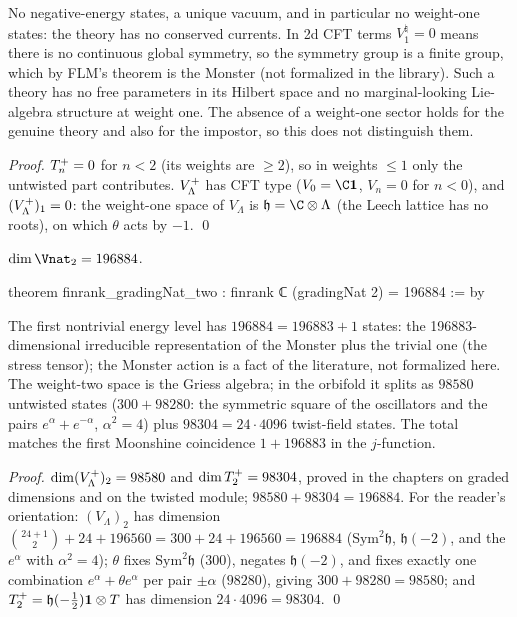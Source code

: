 \begin{physics}
No negative-energy states, a unique vacuum, and in particular no weight-one states: the theory has no conserved currents. In 2d CFT terms $V^\natural_1=0$ means there is no continuous global symmetry, so the symmetry group is a finite group, which by FLM's theorem is the Monster (not formalized in the library). Such a theory has no free parameters in its Hilbert space and no marginal-looking Lie-algebra structure at weight one. The absence of a weight-one sector holds for the genuine theory and also for the impostor, so this does not distinguish them.
\end{physics}

\emph{Proof.} $T^{+}_n=0$ for $n<2$ (its weights are $\ge2$), so in weights $\le1$ only the
untwisted part contributes.  $V_{\Lambda}^{+}$ has CFT type ($V_0=\C\mathbf 1$, $V_n=0$ for $n<0$), and
$(V_{\Lambda}^{+})_1=0$: the weight-one space of $V_\Lambda$ is $\mathfrak h=\C\otimes\Lambda$ (the Leech
lattice has no roots), on which $\theta$ acts by $-1$. \qed

\begin{theorem}\label{ch10:thm:griess}
$\dim\Vnat_2=196884$.
\end{theorem}
\begin{leancode}
theorem finrank_gradingNat_two : finrank ℂ (gradingNat 2) = 196884 := by
\end{leancode}

\begin{physics}
The first nontrivial energy level has $196884=196883+1$ states: the 196883-dimensional irreducible representation of the Monster plus the trivial one (the stress tensor); the Monster action is a fact of the literature, not formalized here. The weight-two space is the Griess algebra; in the orbifold it splits as $98580$ untwisted states ($300+98280$: the symmetric square of the oscillators and the pairs $e^\alpha+e^{-\alpha}$, $\alpha^2=4$) plus $98304=24\cdot4096$ twist-field states. The total matches the first Moonshine coincidence $1+196883$ in the $j$-function.
\end{physics}

\emph{Proof.} $\dim(V_{\Lambda}^{+})_2=98580$ and $\dim T^{+}_2=98304$, proved in the chapters on graded
dimensions and on the twisted module; $98580+98304=196884$.  For the reader's orientation:
$(V_\Lambda)_2$ has dimension $\binom{24+1}{2}+24+196560=300+24+196560=196884$ ($\mathrm{Sym}^2\mathfrak h$,
$\mathfrak h(-2)$, and the $e^\alpha$ with $\alpha^2=4$); $\theta$ fixes $\mathrm{Sym}^2\mathfrak h$ ($300$),
negates $\mathfrak h(-2)$, and fixes exactly one combination $e^\alpha+\theta e^\alpha$ per pair
$\pm\alpha$ ($98280$), giving $300+98280=98580$; and $T^{+}_2=\mathfrak h(-\tfrac12)\mathbf
1\otimes T$ has dimension $24\cdot4096=98304$. \qed

